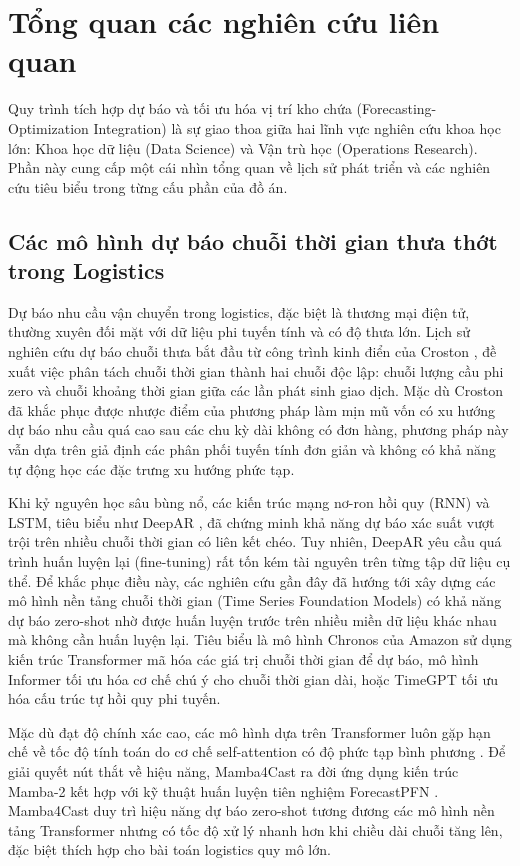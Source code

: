 \section{Tổng quan các nghiên cứu liên quan}

Quy trình tích hợp dự báo và tối ưu hóa vị trí kho chứa (Forecasting-Optimization Integration) là sự giao thoa giữa hai lĩnh vực nghiên cứu khoa học lớn: Khoa học dữ liệu (Data Science) và Vận trù học (Operations Research). Phần này cung cấp một cái nhìn tổng quan về lịch sử phát triển và các nghiên cứu tiêu biểu trong từng cấu phần của đồ án.

\subsection{Các mô hình dự báo chuỗi thời gian thưa thớt trong Logistics}
Dự báo nhu cầu vận chuyển trong logistics, đặc biệt là thương mại điện tử, thường xuyên đối mặt với dữ liệu phi tuyến tính và có độ thưa lớn. Lịch sử nghiên cứu dự báo chuỗi thưa bắt đầu từ công trình kinh điển của Croston \cite{croston1972}, đề xuất việc phân tách chuỗi thời gian thành hai chuỗi độc lập: chuỗi lượng cầu phi zero và chuỗi khoảng thời gian giữa các lần phát sinh giao dịch. Mặc dù Croston đã khắc phục được nhược điểm của phương pháp làm mịn mũ vốn có xu hướng dự báo nhu cầu quá cao sau các chu kỳ dài không có đơn hàng, phương pháp này vẫn dựa trên giả định các phân phối tuyến tính đơn giản và không có khả năng tự động học các đặc trưng xu hướng phức tạp.

Khi kỷ nguyên học sâu bùng nổ, các kiến trúc mạng nơ-ron hồi quy (RNN) và LSTM, tiêu biểu như DeepAR \cite{bhethanabhotla2024}, đã chứng minh khả năng dự báo xác suất vượt trội trên nhiều chuỗi thời gian có liên kết chéo. Tuy nhiên, DeepAR yêu cầu quá trình huấn luyện lại (fine-tuning) rất tốn kém tài nguyên trên từng tập dữ liệu cụ thể. Để khắc phục điều này, các nghiên cứu gần đây đã hướng tới xây dựng các mô hình nền tảng chuỗi thời gian (Time Series Foundation Models) có khả năng dự báo zero-shot nhờ được huấn luyện trước trên nhiều miền dữ liệu khác nhau mà không cần huấn luyện lại. Tiêu biểu là mô hình Chronos của Amazon \cite{ansari2024} sử dụng kiến trúc Transformer mã hóa các giá trị chuỗi thời gian để dự báo, mô hình Informer \cite{zhou2021} tối ưu hóa cơ chế chú ý cho chuỗi thời gian dài, hoặc TimeGPT \cite{garza2023} tối ưu hóa cấu trúc tự hồi quy phi tuyến. 

Mặc dù đạt độ chính xác cao, các mô hình dựa trên Transformer luôn gặp hạn chế về tốc độ tính toán do cơ chế self-attention có độ phức tạp bình phương \cite{nie2023}. Để giải quyết nút thắt về hiệu năng, Mamba4Cast \cite{bhethanabhotla2024} ra đời ứng dụng kiến trúc Mamba-2 \cite{dao2024} kết hợp với kỹ thuật huấn luyện tiên nghiệm ForecastPFN \cite{dooley2023}. Mamba4Cast duy trì hiệu năng dự báo zero-shot tương đương các mô hình nền tảng Transformer nhưng có tốc độ xử lý nhanh hơn khi chiều dài chuỗi tăng lên, đặc biệt thích hợp cho bài toán logistics quy mô lớn.

